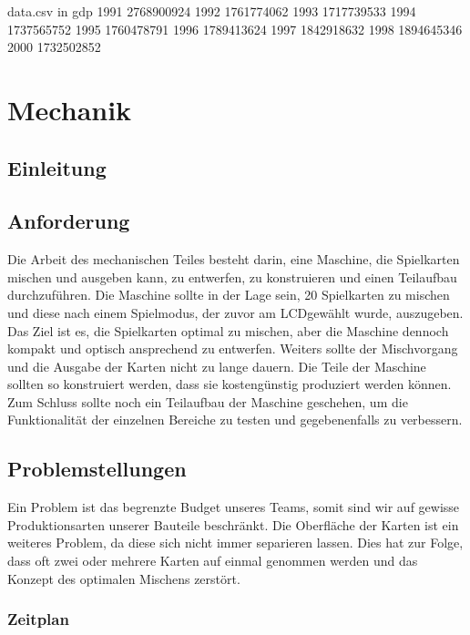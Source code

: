 \begin{filecontents*}{data.csv}
    in gdp
    1991  2768900924
    1992  1761774062
    1993  1717739533
    1994  1737565752
    1995  1760478791
    1996  1789413624
    1997  1842918632
    1998  1894645346
    2000  1732502852
\end{filecontents*}

\chapter{Mechanik}
\section{Einleitung}

\section{Anforderung}
\label{sec:Anforderung}
Die Arbeit des mechanischen Teiles besteht darin, eine Maschine,
die Spielkarten mischen und ausgeben kann, zu entwerfen, zu konstruieren
und einen Teilaufbau durchzuführen. Die Maschine sollte in der Lage
sein, 20 Spielkarten zu mischen und diese nach einem Spielmodus, der
zuvor am \acs{LCD}gewählt wurde, auszugeben. Das Ziel ist es, die Spielkarten
optimal zu mischen, aber die Maschine dennoch kompakt und optisch
ansprechend zu entwerfen. Weiters sollte der Mischvorgang und die
Ausgabe der Karten nicht zu lange dauern. Die Teile der Maschine
sollten so konstruiert werden, dass sie kostengünstig produziert
werden können. Zum Schluss sollte noch ein Teilaufbau der Maschine
geschehen, um die Funktionalität der einzelnen Bereiche zu testen
und gegebenenfalls zu verbessern.

\section{Problemstellungen}
Ein Problem ist das begrenzte Budget unseres Teams, somit sind
wir auf gewisse Produktionsarten unserer Bauteile beschränkt.
Die Oberfläche der Karten ist ein
weiteres Problem, da diese sich nicht immer separieren lassen. Dies
hat zur Folge, dass oft zwei oder mehrere Karten auf einmal genommen
werden und das Konzept des optimalen Mischens zerstört.

\newpage
\subsection{Zeitplan}

